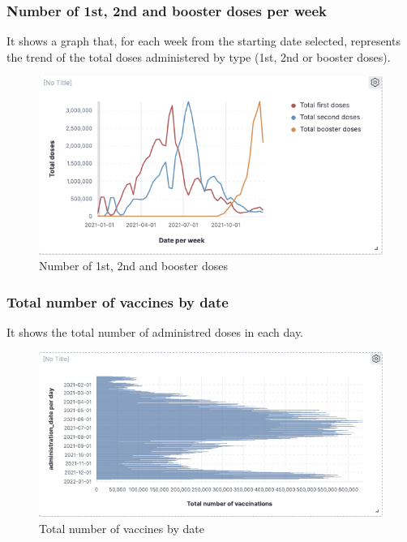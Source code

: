 \documentclass[12pt, a4paper]{article}
\begin{document}
\subsubsection{Number of 1st, 2nd and booster doses per week}
It shows a graph that, for each week from the starting date selected, represents the 
trend of the total doses administered by type (1st, 2nd or booster doses).
\begin{figure}[ht]
  \centering
  \includegraphics[width=.8\linewidth]{img (11).png}
\caption*{Number of 1st, 2nd and booster doses}
\end{figure}

\subsubsection{Total number of vaccines by date}
It shows the total number of administred doses in each day.
\begin{figure}[ht]
  \centering
  \includegraphics[width=.8\linewidth]{img (12).png}
\caption*{Total number of vaccines by date}
\end{figure}
\end{document}

